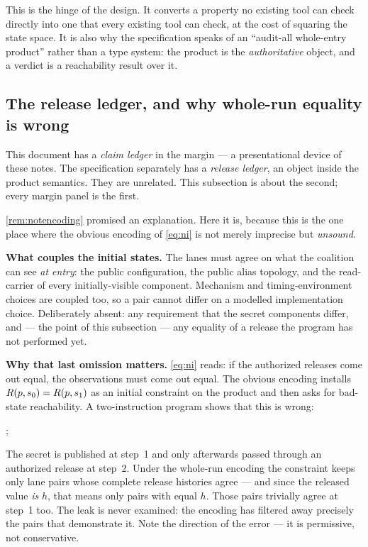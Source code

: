 This is the hinge of the design. It converts a property no existing tool can
check directly into one that every existing tool can check, at the cost of
squaring the state space. It is also why the specification speaks of an
``audit-all whole-entry product'' rather than a type system: the product is the
\emph{authoritative} object, and a verdict is a reachability result over it.

\subsection{The release ledger, and why whole-run equality is wrong}
\label{sec:ledger}

\begin{remark}
This document has a \emph{claim ledger} in the margin --- a presentational device
of these notes. The specification separately has a \emph{release ledger}, an
object inside the product semantics. They are unrelated. This subsection is about
the second; every margin panel is the first.
\end{remark}

\cref{rem:notencoding} promised an explanation. Here it is, because this is the
one place where the obvious encoding of \eqref{eq:ni} is not merely imprecise but
\emph{unsound}.

\textbf{What couples the initial states.} The lanes must agree on what the
coalition can see \emph{at entry}: the public configuration, the public alias
topology, and the read-carrier of every initially-visible component. Mechanism
and timing-environment choices are coupled too, so a pair cannot differ on a
modelled implementation choice. Deliberately absent: any requirement that the
secret components differ, and --- the point of this subsection --- any equality of
a release the program has not performed yet.

\textbf{Why that last omission matters.} \eqref{eq:ni} reads: if the authorized
releases come out equal, the observations must come out equal. The obvious
encoding installs $R(p,s_0) = R(p,s_1)$ as an initial constraint on the
product and then asks for bad-state reachability. A two-instruction program shows
that this is wrong:

\begin{center}
 \quad;\quad {}
\end{center}

The secret is published at step~1 and only afterwards passed through an authorized
release at step~2. Under the whole-run encoding the constraint keeps only lane
pairs whose complete release histories agree --- and since the released value
\emph{is} $h$, that means only pairs with equal $h$. Those pairs trivially agree at
step~1 too. The leak is never examined: the encoding has filtered away precisely
the pairs that demonstrate it. Note the direction of the error --- it is
permissive, not conservative.

